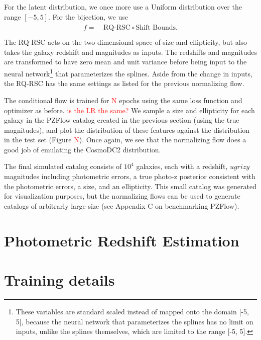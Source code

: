 \documentclass[twocolumn]{aastex631}
\newcommand{\note}[1]{\textsf{\textcolor{red}{#1}}}
\begin{document}
For the latent distribution, we once more use a Uniform distribution over the range $[-5, 5]$.
For the bijection, we use
\begin{align}
    \begin{split}
        f =& ~ \text{RQ-RSC} \circ \text{Shift Bounds}. \\
    \end{split}
\end{align}
The RQ-RSC acts on the two dimensional space of size and ellipticity, but also takes the galaxy redshift and magnitudes as inputs.
The redshifts and magnitudes are transformed to have zero mean and unit variance before being input to the neural network\footnote{These variables are standard scaled instead of mapped onto the domain [-5, 5], because the neural network that parameterizes the splines has no limit on inputs, unlike the splines themselves, which are limited to the range [-5, 5].} that parameterizes the splines.
Aside from the change in inputs, the RQ-RSC has the same settings as listed for the previous normalizing flow.

The conditional flow is trained for \note{N} epochs using the same loss function and optimizer as before.
\note{is the LR the same?}
We sample a size and ellipticity for each galaxy in the PZFlow catalog created in the previous section (using the true magnitudes), and plot the distribution of these features against the distribution in the test set (Figure \note{N}).
Once again, we see that the normalizing flow does a good job of emulating the CosmoDC2 distribution.

The final simulated catalog consists of $10^4$ galaxies, each with a redshift, $ugrizy$ magnitudes including photometric errors, a true photo-z posterior consistent with the photometric errors, a size, and an ellipticity.
This small catalog was generated for visualization purposes, but the normalizing flows can be used to generate catalogs of arbitrarly large size (see Appendix C on benchmarking PZFlow).


\section{Photometric Redshift Estimation}
\label{sec:photo-z}

\appendix

\section{Training details}
\end{document}
